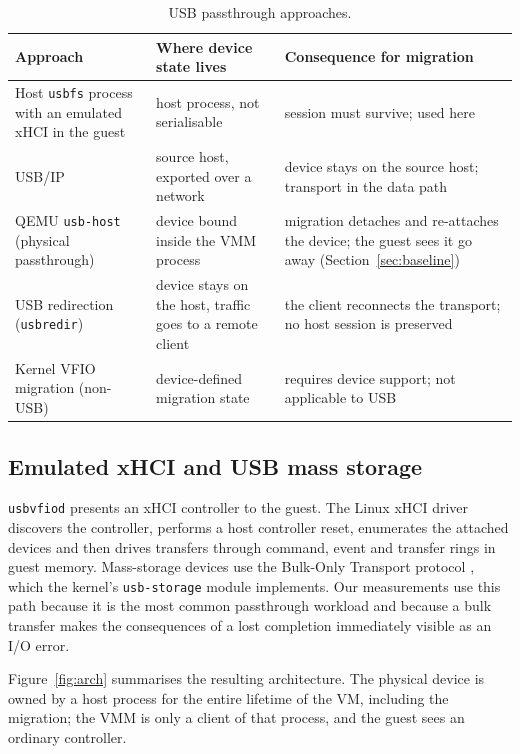 \documentclass[10pt,conference]{IEEEtran}
\newcommand{\code}[1]{\texttt{#1}}
\begin{document}
\begin{table}[t]
\centering
\caption{USB passthrough approaches.}
\label{tab:approaches}
\footnotesize
\setlength{\tabcolsep}{3pt}
\begin{tabular}{@{}>{\raggedright\arraybackslash}p{1.85cm}>{\raggedright\arraybackslash}p{2.35cm}p{3.0cm}@{}}
\toprule
Approach & Where device state lives & Consequence for migration \\
\midrule
Host \code{usbfs} process with an emulated xHCI in the guest \cite{usbvfiodrepo} & host process, not serialisable & session must survive; used here \\
USB/IP \cite{hirofuchi2005usbip,kernelusbip} & source host, exported over a network & device stays on the source host; transport in the data path \\
QEMU \code{usb-host} (physical passthrough) \cite{qemuusb,libvirtmigrationsrc} & device bound inside the VMM process & migration detaches and re-attaches the device; the guest sees it go away (Section~\ref{sec:baseline}) \\
USB redirection (\code{usbredir}) \cite{usbredir} & device stays on the host, traffic goes to a remote client & the client reconnects the transport; no host session is preserved \\
Kernel VFIO migration (non-USB) \cite{vfiomigrationuapi} & device-defined migration state & requires device support; not applicable to USB \\
\bottomrule
\end{tabular}
\end{table}

\subsection{Emulated xHCI and USB mass storage}
\code{usbvfiod} presents an xHCI controller \cite{xhcispec} to the guest. The
Linux xHCI driver discovers the controller, performs a host controller reset,
enumerates the attached devices and then drives transfers through command,
event and transfer rings in guest memory. Mass-storage devices use the
Bulk-Only Transport protocol \cite{usbbot}, which the kernel's
\code{usb-storage} module implements. Our measurements use this path because it
is the most common passthrough workload and because a bulk transfer makes the
consequences of a lost completion immediately visible as an I/O error.

Figure~\ref{fig:arch} summarises the resulting architecture. The physical device
is owned by a host process for the entire lifetime of the VM, including the
migration; the VMM is only a client of that process, and the guest sees an
ordinary controller.
\end{document}
